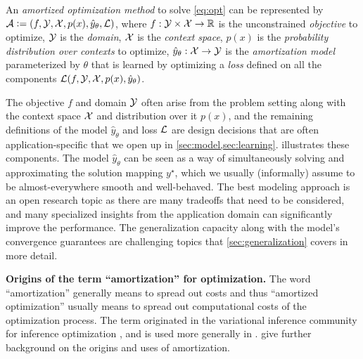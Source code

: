 \documentclass[twoside,11pt]{article}
\begin{document}
\begin{definition}
  An \emph{amortized optimization method} to solve \cref{eq:opt}
  can be represented by
  ${\mathcal{A}}\vcentcolon= (f, {\mathcal{Y}}, {\mathcal{X}}, p(x), \hat y_\theta, {\mathcal{L}})$,
  where
  $f: {\mathcal{Y}}\times{\mathcal{X}} \rightarrow \mathbb{R}$ is the
  unconstrained \emph{objective} to optimize,
  ${\mathcal{Y}}$ is the \emph{domain},
  ${\mathcal{X}}$ is the \emph{context space},
  $p(x)$ is the \emph{probability distribution over contexts} to optimize,
  $\hat y_\theta: {\mathcal{X}}\rightarrow {\mathcal{Y}}$ is the \emph{amortization model}
  parameterized by $\theta$
  that is learned by optimizing a \emph{loss}
  defined on all the components
  ${\mathcal{L}}(f, {\mathcal{Y}}, {\mathcal{X}}, p(x), \hat y_\theta)$.
  \label{def:amor}
\end{definition}

The objective $f$ and domain ${\mathcal{Y}}$ often arise from
the problem setting along with the context space
${\mathcal{X}}$ and distribution over it $p(x)$, and
the remaining definitions of the model
$\hat y_\theta$ and loss ${\mathcal{L}}$ are design decisions
that are often application-specific that we open up
in \cref{sec:model,sec:learning}.
 illustrates these components.
The model $\hat y_\theta$ can be seen as a way
of simultaneously solving and approximating the
solution mapping $y^\star$, which we usually (informally)
assume to be almost-everywhere smooth and well-behaved.
The best modeling approach is an open research topic
as there are many tradeoffs that need to be considered,
and many specialized insights from the application domain
can significantly improve the performance.
The generalization capacity along with the model's
convergence guarantees are challenging topics
that \cref{sec:generalization} covers in more detail.

\textbf{Origins of the term ``amortization'' for optimization.}
The word ``amortization'' generally means to spread out costs and
thus ``amortized optimization'' usually means to spread out
computational costs of the optimization process.
The term originated in the variational inference community
for inference optimization
\citep{kingma2013auto,rezende2014stochastic,stuhlmuller2013learning,gershman2014amortized,webb2017faithful,ravi2018amortized,cremer2018inference,wu2020meta},
and is used more generally in
\citep{xue2020amortized,sercu2021neural,xiao2021amortized}.
\citet[p.~28]{marino2021learned} give further background on the
origins and uses of amortization.
\end{document}
